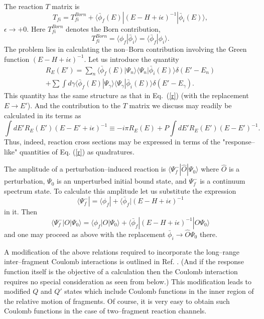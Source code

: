 \documentclass[12pt,ams,preprint,a4paper]{revtex4}
\begin{document}
  
The reaction $T$ matrix is  \cite{GW}
\begin{equation} T_{fi}=T_{fi}^{Born}+
\langle{\bar\phi}_f(E)|(E-H+i\epsilon)^{-1}|{\bar\phi}_i(E)\rangle,\label{t}\end{equation}
\mbox{$\epsilon\rightarrow+0$}. Here $T_{fi}^{Born}$ denotes the  Born contribution,
$$
T_{fi}^{Born}=\langle\phi_f|{\bar\phi}_i\rangle=\langle{\bar\phi}_f|\phi_i\rangle.
$$
The problem lies in calculating the non--Born contribution involving
the Green function \mbox{$(E-H+i\epsilon)^{-1}$}. 
Let us introduce the quantity
\begin{eqnarray} R_E(E')=
\sum_n \langle {\bar\phi}_f(E)|\Psi_n\rangle\langle\Psi_n|{\bar\phi}_i(E)\rangle
\delta(E'-E_n)\nonumber\\
+\sum\!\!\!\!\!\!\!\int d\gamma
\langle {\bar\phi}_f(E)|\Psi_\gamma\rangle\langle\Psi_\gamma|{\bar\phi}_i(E)\rangle
\delta(E'-E_\gamma).\label{resp}\end{eqnarray}
This quantity has the same structure as that in Eq.~(\ref{r}) (with the replacement \mbox{$E\rightarrow E'$}).
And the contribution to the $T$ matrix we discuss may  readily be calculated in its
terms as
\begin{equation}\int dE' R_E(E')(E-E'+i\epsilon)^{-1}\equiv-i\pi R_E(E)+P\int dE' R_E(E')(E-E')^{-1}.
\label{rint}\end{equation}
Thus, indeed, reaction cross sections
may be expressed in terms of the "response--like" quantities
of Eq. (\ref{r}) as quadratures.


The amplitude of a perturbation--induced reaction is \mbox{$\langle\Psi^-_f|\hat{O}|\Psi_0\rangle$}
 where  
${\hat O}$ is a perturbation, $\Psi_0$ is an unperturbed initial bound state, and $\Psi^-_f$ is 
a continuum spectrum state. To calculate this amplitude let us substitute  the expression
\cite{GW}
$$
\langle\Psi^-_f|=\langle\phi_f|+\langle{\bar\phi_f}|(E-H+i\epsilon)^{-1}
$$
in it. Then 
\begin{equation}\langle\Psi^-_f|O|\Psi_0\rangle=\langle\phi_f|O|\Psi_0\rangle+
\langle{\bar \phi}_f|(E-H+i\epsilon)^{-1}|O\Psi_0\rangle\label{r1}\end{equation}
and one may proceed as above 
with  the replacement \mbox{${\bar\phi}_i\rightarrow {\hat O}\Psi_0$}
there. 

A modification of the above relations required to incorporate the
long--range inter--fragment Coulomb interactions is outlined in Ref. \cite{efr99}.
(And if the response function itself is the objective of a calculation then the Coulomb interaction 
requires no special consideration as
seen from below.)
This modification leads to modified $Q$ and $Q'$ states which
include Coulomb functions in the inner region of the relative motion of fragments.
Of course, it is very easy to obtain such Coulomb functions in the case of two--fragment reaction
channels.  
\end{document}
